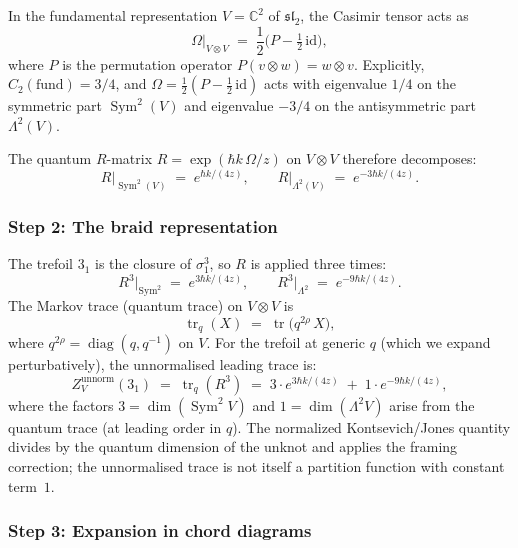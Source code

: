 \documentclass[11pt]{article}
\newcommand{\fsl}{\mathfrak{sl}}
\newcommand{\C}{\mathbb{C}}
\DeclareMathOperator{\Sym}{Sym}
\DeclareMathOperator{\diag}{diag}
\begin{document}
In the fundamental representation $V = \C^2$ of $\fsl_2$, the
Casimir tensor acts as
\begin{equation}\label{eq:casimir-fund}
  \Omega\big|_{V \otimes V}
  \;=\;
  \frac{1}{2}\bigl(P - \tfrac{1}{2}\,\mathrm{id}\bigr),
\end{equation}
where $P$ is the permutation operator $P(v \otimes w) = w \otimes v$.
Explicitly, $C_2(\mathrm{fund}) = 3/4$, and
$\Omega = \frac{1}{2}(P - \frac{1}{2}\,\mathrm{id})$ acts with
eigenvalue $1/4$ on the symmetric part $\Sym^2(V)$
and eigenvalue $-3/4$ on the antisymmetric part
$\Lambda^2(V)$.

The quantum $R$-matrix $R = \exp(\hbar k\,\Omega/z)$ on
$V \otimes V$ therefore decomposes:
\begin{equation}\label{eq:R-eigenvalues}
  R\big|_{\Sym^2(V)}
  \;=\;
  e^{\hbar k/(4z)},
  \qquad
  R\big|_{\Lambda^2(V)}
  \;=\;
  e^{-3\hbar k/(4z)}.
\end{equation}

\subsubsection{Step 2: The braid representation}

The trefoil $3_1$ is the closure of $\sigma_1^3$, so
$R$ is applied three times:
\begin{equation}\label{eq:R-cubed}
  R^3\big|_{\Sym^2}
  \;=\;
  e^{3\hbar k/(4z)},
  \qquad
  R^3\big|_{\Lambda^2}
  \;=\;
  e^{-9\hbar k/(4z)}.
\end{equation}
The Markov trace (quantum trace) on $V \otimes V$ is
\[
  \operatorname{tr}_q(X)
  \;=\;
  \operatorname{tr}\bigl(q^{2\rho}\, X\bigr),
\]
where $q^{2\rho} = \diag(q, q^{-1})$ on $V$.
For the trefoil at generic $q$ (which we expand perturbatively), the
unnormalised leading trace is:
\begin{equation}\label{eq:markov-trace}
  Z_{V}^{\mathrm{unnorm}}(3_1)
  \;=\;
  \operatorname{tr}_q(R^3)
  \;=\;
  3 \cdot e^{3\hbar k/(4z)}
  \;+\;
  1 \cdot e^{-9\hbar k/(4z)},
\end{equation}
where the factors $3 = \dim(\Sym^2 V)$ and
$1 = \dim(\Lambda^2 V)$ arise from the quantum trace
(at leading order in $q$).  The normalized Kontsevich/Jones
quantity divides by the quantum dimension of the unknot and applies
the framing correction; the unnormalised trace is not itself a
partition function with constant term~$1$.

\subsubsection{Step 3: Expansion in chord diagrams}
\end{document}
